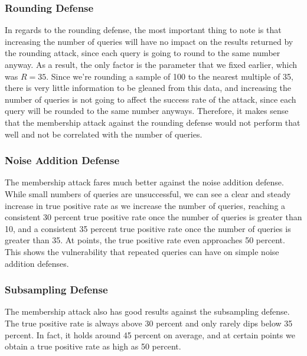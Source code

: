\documentclass[12pt]{article}
\begin{document}
\subsubsection{Rounding Defense}

\noindent

In regards to the rounding defense, the most important thing to note is that increasing the number of queries will have no impact on the results returned by the rounding attack, since each query is going to round to the same number anyway. As a result, the only factor is the parameter that we fixed earlier, which was $R = 35$. Since we're rounding a sample of 100 to the nearest multiple of 35, there is very little information to be gleaned from this data, and increasing the number of queries is not going to affect the success rate of the attack, since each query will be rounded to the same number anyways. Therefore, it makes sense that the membership attack against the rounding defense would not perform that well and not be correlated with the number of queries.

\subsubsection{Noise Addition Defense}

\noindent

The membership attack fares much better against the noise addition defense. While small numbers of queries are unsuccessful, we can see a clear and steady increase in true positive rate as we increase the number of queries, reaching a consistent 30 percent true positive rate once the number of queries is greater than 10, and a consistent 35 percent true positive rate once the number of queries is greater than 35. At points, the true positive rate even approaches 50 percent. This shows the vulnerability that repeated queries can have on simple noise addition defenses.

\subsubsection{Subsampling Defense}

\noindent

The membership attack also has good results against the subsampling defense. The true positive rate is always above 30 percent and only rarely dips below 35 percent. In fact, it holds around 45 percent on average, and at certain points we obtain a true positive rate as high as 50 percent.
\end{document}
